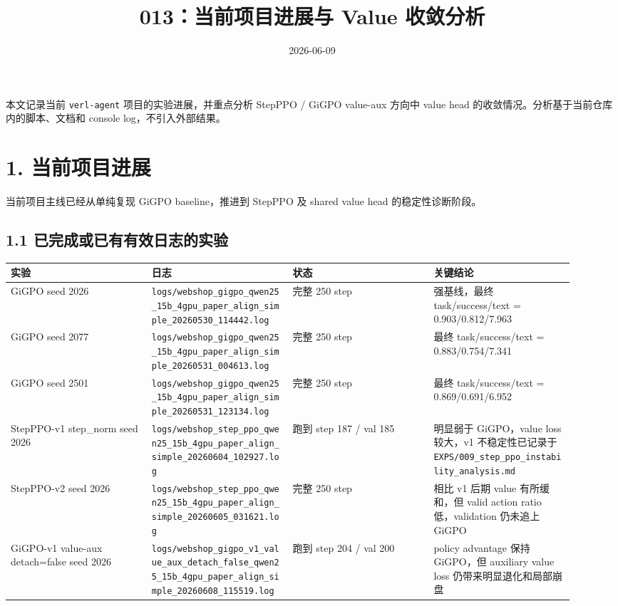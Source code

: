 \documentclass[10pt]{ctexart}
\title{013：当前项目进展与 Value 收敛分析}
\author{}
\date{2026-06-09}
\begin{document}
\maketitle
\vspace{-1.2em}

本文记录当前 \texttt{verl-agent} 项目的实验进展，并重点分析 StepPPO / GiGPO value-aux 方向中 value head 的收敛情况。分析基于当前仓库内的脚本、文档和 console log，不引入外部结果。

\section*{1. 当前项目进展}

当前项目主线已经从单纯复现 GiGPO baseline，推进到 StepPPO 及 shared value head 的稳定性诊断阶段。

\subsection*{1.1 已完成或已有有效日志的实验}

\begin{small}
\begin{longtable}{@{}p{0.23\linewidth}p{0.23\linewidth}p{0.23\linewidth}p{0.23\linewidth}@{}}
\toprule
实验 & 日志 & 状态 & 关键结论 \\
\midrule
GiGPO seed 2026 & \texttt{logs/webshop\_gigpo\_qwen25\_15b\_4gpu\_paper\_align\_simple\_20260530\_114442.log} & 完整 250 step & 强基线，最终 task/success/text = 0.903/0.812/7.963 \\
GiGPO seed 2077 & \texttt{logs/webshop\_gigpo\_qwen25\_15b\_4gpu\_paper\_align\_simple\_20260531\_004613.log} & 完整 250 step & 最终 task/success/text = 0.883/0.754/7.341 \\
GiGPO seed 2501 & \texttt{logs/webshop\_gigpo\_qwen25\_15b\_4gpu\_paper\_align\_simple\_20260531\_123134.log} & 完整 250 step & 最终 task/success/text = 0.869/0.691/6.952 \\
StepPPO-v1 step\_norm seed 2026 & \texttt{logs/webshop\_step\_ppo\_qwen25\_15b\_4gpu\_paper\_align\_simple\_20260604\_102927.log} & 跑到 step 187 / val 185 & 明显弱于 GiGPO，value loss 较大，v1 不稳定性已记录于 \texttt{EXPS/009\_step\_ppo\_instability\_analysis.md} \\
StepPPO-v2 seed 2026 & \texttt{logs/webshop\_step\_ppo\_qwen25\_15b\_4gpu\_paper\_align\_simple\_20260605\_031621.log} & 完整 250 step & 相比 v1 后期 value 有所缓和，但 valid action ratio 低，validation 仍未追上 GiGPO \\
GiGPO-v1 value-aux detach=false seed 2026 & \texttt{logs/webshop\_gigpo\_v1\_value\_aux\_detach\_false\_qwen25\_15b\_4gpu\_paper\_align\_simple\_20260608\_115519.log} & 跑到 step 204 / val 200 & policy advantage 保持 GiGPO，但 auxiliary value loss 仍带来明显退化和局部崩盘 \\
\bottomrule
\end{longtable}
\end{small}
\end{document}

